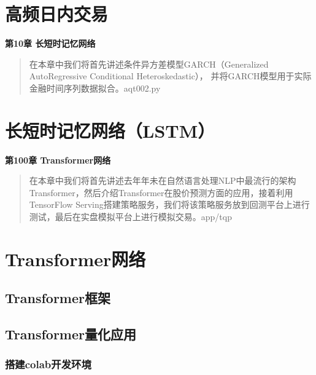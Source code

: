 \documentclass{article}
\begin{document}
\section{高频日内交易}

\maketitle\begin{center}
\Large \textbf{第10章 长短时记忆网络}
\end{center}
\begin{abstract}
在本章中我们将首先讲述条件异方差模型GARCH（Generalized AutoRegressive Conditional Heteroskedastic），
并将GARCH模型用于实际金融时间序列数据拟合。aqt002.py
\end{abstract}
\section{长短时记忆网络（LSTM）}

\maketitle\begin{center}
\Large \textbf{第100章 \quad Transformer网络}
\end{center}
\begin{abstract}
在本章中我们将首先讲述去年年未在自然语言处理NLP中最流行的架构Transformer，然后介绍Transformer在股价预测方面的应用，接着利用TensorFlow Serving搭建策略服务，我们将该策略服务放到回测平台上进行测试，最后在实盘模拟平台上进行模拟交易。app/tqp
\end{abstract}
\section{Transformer网络}
\subsection{Transformer框架}
\subsection{Transformer量化应用}
\subsubsection{搭建colab开发环境}
\end{document}
